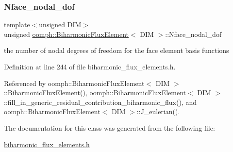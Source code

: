 \mbox{\label{classoomph_1_1BiharmonicFluxElement_a00a39afe7b520d6439a29039d3ad041a}} 
\subsubsection{\texorpdfstring{Nface\+\_\+nodal\+\_\+dof}{Nface\_nodal\_dof}}
{\footnotesize\ttfamily template$<$unsigned D\+IM$>$ \\
unsigned \hyperlink{classoomph_1_1BiharmonicFluxElement}{oomph\+::\+Biharmonic\+Flux\+Element}$<$ D\+IM $>$\+::Nface\+\_\+nodal\+\_\+dof\hspace{0.3cm}{\ttfamily [private]}}



the number of nodal degrees of freedom for the face element basis functions 



Definition at line 244 of file biharmonic\+\_\+flux\+\_\+elements.\+h.



Referenced by oomph\+::\+Biharmonic\+Flux\+Element$<$ D\+I\+M $>$\+::\+Biharmonic\+Flux\+Element(), oomph\+::\+Biharmonic\+Flux\+Element$<$ D\+I\+M $>$\+::fill\+\_\+in\+\_\+generic\+\_\+residual\+\_\+contribution\+\_\+biharmonic\+\_\+flux(), and oomph\+::\+Biharmonic\+Flux\+Element$<$ D\+I\+M $>$\+::\+J\+\_\+eulerian().



The documentation for this class was generated from the following file\+:\begin{DoxyCompactItemize}
\item 
\hyperlink{biharmonic__flux__elements_8h}{biharmonic\+\_\+flux\+\_\+elements.\+h}\end{DoxyCompactItemize}

